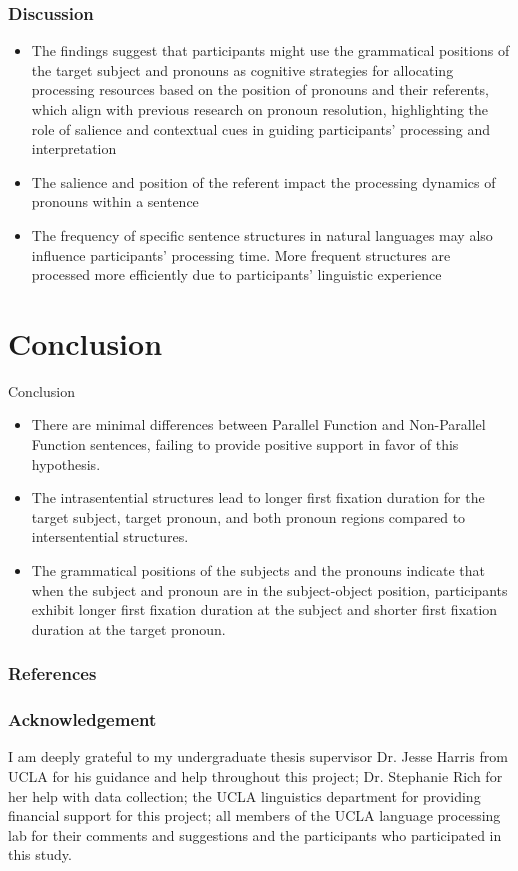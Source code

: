 \documentclass{beamer}
\begin{document}
\begin{frame}
\frametitle{Discussion}
\begin{itemize}
    \item The findings suggest that participants might use the grammatical positions of the target subject and pronouns as cognitive strategies for allocating processing resources based on the position of pronouns and their referents, which align with previous research on pronoun resolution, highlighting the role of salience and contextual cues in guiding participants' processing and interpretation \cite{arnold2015effects}\cite{brennan1987centering}\cite{garnham2013mental}
    \item The salience and position of the referent impact the processing dynamics of pronouns within a sentence \cite{macdonald2013language}
    \item The frequency of specific sentence structures in natural languages may also influence participants' processing time. More frequent structures are processed more efficiently due to participants' linguistic experience \cite{montag2015text}\cite{tanenhaus1995sentence}
\end{itemize}
\end{frame}

\section{Conclusion}
    \begin{frame}{Conclusion}
    \begin{itemize}
    \item There are minimal differences between Parallel Function and Non-Parallel Function sentences, failing to provide positive support in favor of this hypothesis. 
    \item The intrasentential structures lead to longer first fixation duration for the target subject, target pronoun, and both pronoun regions compared to intersentential structures. 
    \item The grammatical positions of the subjects and the pronouns indicate that when the subject and pronoun are in the subject-object position, participants exhibit longer first fixation duration at the subject and shorter first fixation duration at the target pronoun.
    \end{itemize}
    \end{frame}


\begin{frame}
\frametitle{References}
    \printbibliography
    \end{frame}


\begin{frame}
\frametitle{Acknowledgement}
I am deeply grateful to my undergraduate thesis supervisor Dr. Jesse Harris from UCLA for his guidance and help throughout this project; Dr. Stephanie Rich for her help with data collection; the UCLA linguistics department for providing financial support for this project; all members of the UCLA language processing lab for their comments and suggestions and the participants who participated in this study.
\end{frame}
\end{document}
